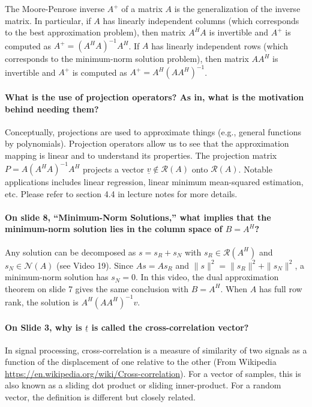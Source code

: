 \documentclass[10pt,english]{article}
\begin{document}
The Moore-Penrose inverse $A^+$ of a matrix $A$ is the generalization of the inverse matrix. In particular, if $A$ has linearly independent columns (which corresponds to the best approximation problem), then matrix $A^HA$ is invertible and $A^+$ is computed as $A^+=(A^HA)^{-1}A^H$.
If $A$ has linearly independent rows (which corresponds to the minimum-norm solution problem), then matrix $AA^H$ is invertible and $A^+$ is computed as $A^+=A^H(AA^H)^{-1}$.

\paragraph{What is the use of projection operators? As in, what is the motivation behind needing them?}
Conceptually, projections are used to approximate things (e.g., general functions by polynomials).
Projection operators allow us to see that the approximation mapping is linear and to understand its properties.
The projection matrix $P=A(A^HA)^{-1}A^H$ projects a vector $\underline{v} \notin \mathcal{R}(A)$ onto $\mathcal{R}(A)$. Notable applications includes linear regression, linear minimum mean-squared estimation, etc. Please refer to section 4.4 in lecture notes for more details.

\paragraph{On slide 8, ``Minimum-Norm Solutions,'' what implies that the minimum-norm solution lies in the column space of $B=A^H$?}

Any solution can be decomposed as $s=s_R+s_N$ with $s_R\in\mathcal{R}(A^H)$ and $s_N\in\mathcal{N}(A)$ (see Video 19).
Since $As=As_R$ and $\|s\|^2=\|s_R\|^2+\|s_N\|^2$, a minimum-norm solution has $s_N=0$.
In this video, the dual approximation theorem on slide 7 gives the same conclusion with $B=A^H$.
When $A$ has full row rank, the solution is $A^H(AA^H)^{-1}v$.


\paragraph{On Slide 3, why is $\underline{t}$ is called the cross-correlation vector?}

In signal processing, cross-correlation is a measure of similarity of two signals as a function of the displacement of one relative to the other (From Wikipedia \url{https://en.wikipedia.org/wiki/Cross-correlation}). For a vector of samples, this is also known as a sliding dot product or sliding inner-product.  For a random vector, the definition is different but closely related.
\end{document}
